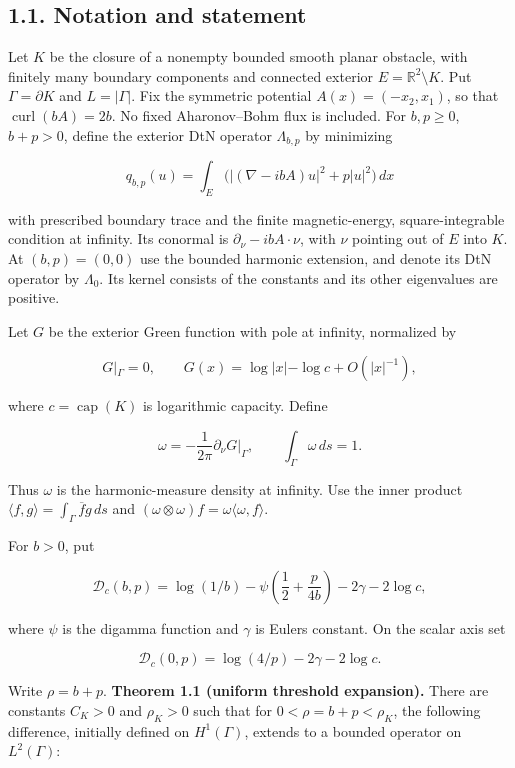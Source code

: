 \documentclass[11pt]{article}
\begin{document}
\subsection{1.1. Notation and statement}\label{notation-and-statement}

Let \(K\) be the closure of a nonempty bounded smooth planar obstacle,
with finitely many boundary components and connected exterior
\(E=\mathbb R^2\setminus K\). Put \(\Gamma=\partial K\) and
\(L=|\Gamma|\). Fix the symmetric potential \(A(x)=(-x_2,x_1)\), so that
\(\operatorname{curl}(bA)=2b\). No fixed Aharonov--Bohm flux is
included. For \(b,p\geq0\), \(b+p>0\), define the exterior DtN operator
\(\Lambda_{b,p}\) by minimizing

\[q_{b,p}(u)=\int_E\bigl(|(\nabla-ibA)u|^2+p|u|^2\bigr)\,dx\]

with prescribed boundary trace and the finite magnetic-energy,
square-integrable condition at infinity. Its conormal is
\(\partial_\nu-ibA\cdot\nu\), with \(\nu\) pointing out of \(E\) into
\(K\). At \((b,p)=(0,0)\) use the bounded harmonic extension, and denote
its DtN operator by \(\Lambda_0\). Its kernel consists of the constants
and its other eigenvalues are positive.

Let \(G\) be the exterior Green function with pole at infinity,
normalized by

\[G|_\Gamma=0,\qquad G(x)=\log|x|-\log c+O(|x|^{-1}),\]

where \(c=\operatorname{cap}(K)\) is logarithmic capacity. Define

\[\omega=-\frac1{2\pi}\partial_\nu G\big|_\Gamma,\qquad \int_\Gamma\omega\,ds=1.\]

Thus \(\omega\) is the harmonic-measure density at infinity. Use the
inner product \(\langle f,g\rangle=\int_\Gamma\overline f g\,ds\) and
\((\omega\otimes\omega)f=\omega\langle\omega,f\rangle\).

For \(b>0\), put

\[\mathcal D_c(b,p)=\log(1/b)-\psi\!\left(\frac12+\frac{p}{4b}\right)-2\gamma-2\log c,\]

where \(\psi\) is the digamma function and \(\gamma\) is
Euler\textquotesingle s constant. On the scalar axis set

\[\mathcal D_c(0,p)=\log(4/p)-2\gamma-2\log c.\]

Write \(\rho=b+p\). \textbf{Theorem 1.1 (uniform threshold expansion).}
There are constants \(C_K>0\) and \(\rho_K>0\) such that for
\(0<\rho=b+p<\rho_K\), the following difference, initially defined on
\(H^1(\Gamma)\), extends to a bounded operator on \(L^2(\Gamma)\):
\end{document}
